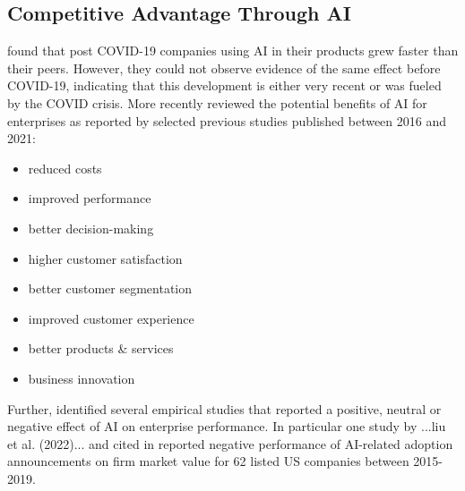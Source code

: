 \subsection{Competitive Advantage Through AI}

\cite{xuCanArtificialIntelligence2021} found that post COVID-19 companies using AI in their products grew
faster than their peers. However, they could not observe evidence of the same effect before COVID-19, indicating
that this development is either very recent or was fueled by the COVID crisis. More recently
\cite{hoArtificialIntelligenceFirm2022} reviewed the potential benefits of AI for enterprises as reported
by selected previous studies published between 2016 and 2021:

\begin{itemize}
    \item reduced costs
    \item improved performance
    \item better decision-making
    \item higher customer satisfaction
    \item better customer segmentation
    \item improved customer experience
    \item better products \& services
    \item business innovation
\end{itemize}

Further, \cite{hoArtificialIntelligenceFirm2022} identified several empirical studies that reported a positive,
neutral or negative effect of AI on enterprise performance. In particular one study by ...liu et al. (2022)...
and cited in \cite{hoArtificialIntelligenceFirm2022} reported negative performance of AI-related adoption 
announcements on firm market value for 62 listed US companies between 2015-2019.
